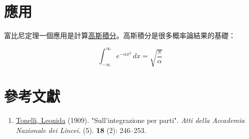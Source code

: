 \section{應用}

富比尼定理一個應用是計算\href{https://zh.wikipedia.org/wiki/高斯积分}{高斯積分}。高斯積分是很多概率論結果的基礎：

\[
{\displaystyle \int _{-\infty }^{\infty }e^{-\alpha x^{2}}\,dx={\sqrt {\frac {\pi }{\alpha }}}}
\]

\section{參考文獻}

\begin{enumerate}
  \item \href{https://zh.wikipedia.org/wiki/列奧尼達·托內利}{Tonelli, Leonida} (1909). "Sull'integrazione per parti". \emph{Atti della Accademia Nazionale dei Lincei}. (5). \textbf{18} (2): 246–253.
\end{enumerate}
